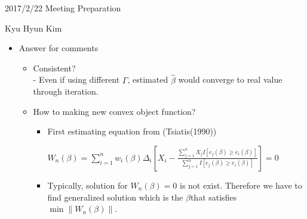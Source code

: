 \documentclass[12pt]{article}
\begin{document}
	
	\begin{center}
		{\Large 2017/2/22 Meeting Preparation}\\
	\end{center}
	\begin{center}
		{\Large Kyu Hyun Kim}	
	\end{center}

	\begin{itemize}
		\item[1.] Answer for comments
			\begin{itemize}
				\item[1)] Consistent?\\
				- Even if using different $\Gamma$, estimated $\hat{\beta}$ would converge to real value through iteration.
				\item[2)] How to making new convex object function?\\
				\begin{itemize}
					\item[-] First estimating equation from (Tsiatis(1990))\\
						\begin{center}
						$W_{n}(\beta)=\sum_{i=1}^{n}w_{i}(\beta)\Delta_{i}[X_{i}-\frac{\sum_{j=1}^{n}X_{j}I[e_{j}(\beta)\ge e_{i}(\beta)]}{\sum_{j=1}^{n}I[e_{j}(\beta)\ge e_{i}(\beta)]}]=0$
						\end{center}
					\item[-] Typically, solution for $W_{n}(\beta)=0$ is not exist. Therefore we have to find generalized solution which is the $\beta$that satisfies $\min\lVert W_{n}(\beta) \rVert$.\\
					

\end{itemize}
\end{itemize}
\end{itemize}
\end{document}
